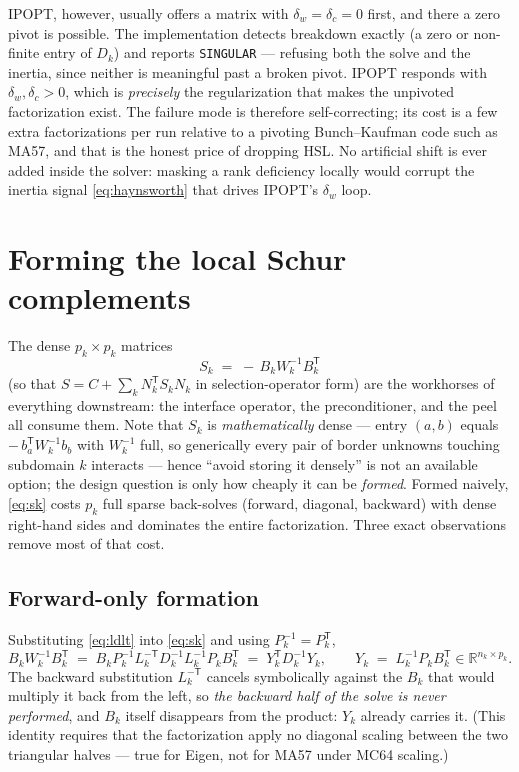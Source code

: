\documentclass[11pt]{article}
\newcommand{\R}{\mathbb{R}}
\newcommand{\code}[1]{\texttt{#1}}
\begin{document}
IPOPT, however, usually offers a matrix with $\delta_w = \delta_c = 0$ first,
and there a zero pivot is possible.  The implementation detects breakdown
exactly (a zero or non-finite entry of $D_k$) and reports
\code{SINGULAR} --- refusing both the solve and the inertia, since neither is
meaningful past a broken pivot.  IPOPT responds with $\delta_w,\delta_c > 0$,
which is \emph{precisely} the regularization that makes the unpivoted
factorization exist.  The failure mode is therefore self-correcting; its cost
is a few extra factorizations per run relative to a pivoting Bunch--Kaufman
code such as MA57, and that is the honest price of dropping HSL.  No
artificial shift is ever added inside the solver: masking a rank deficiency
locally would corrupt the inertia signal \eqref{eq:haynsworth} that drives
IPOPT's $\delta_w$ loop.

\section{Forming the local Schur complements}
\label{sec:sk}

The dense $p_k \times p_k$ matrices
\begin{equation}
  S_k \;=\; -\,B_k W_k^{-1} B_k^{\mathsf T}
  \label{eq:sk}
\end{equation}
(so that $S = C + \sum_k N_k^{\mathsf T} S_k N_k$ in selection-operator form)
are the workhorses of everything downstream: the interface operator, the
preconditioner, and the peel all consume them.  Note that $S_k$ is
\emph{mathematically} dense --- entry $(a,b)$ equals
$-\,b_a^{\mathsf T} W_k^{-1} b_b$ with $W_k^{-1}$ full, so generically every
pair of border unknowns touching subdomain $k$ interacts --- hence ``avoid
storing it densely'' is not an available option; the design question is only
how cheaply it can be \emph{formed}.  Formed naively, \eqref{eq:sk} costs
$p_k$ full sparse back-solves (forward, diagonal, backward) with dense
right-hand sides and dominates the entire factorization.  Three exact
observations remove most of that cost.

\subsection{Forward-only formation}

Substituting \eqref{eq:ldlt} into \eqref{eq:sk} and using
$P_k^{-1} = P_k^{\mathsf T}$,
\begin{equation}
  B_k W_k^{-1} B_k^{\mathsf T}
  \;=\; B_k P_k^{-1} L_k^{-\mathsf T} D_k^{-1} L_k^{-1} P_k B_k^{\mathsf T}
  \;=\; Y_k^{\mathsf T} D_k^{-1} Y_k,
  \qquad
  Y_k \;=\; L_k^{-1} P_k B_k^{\mathsf T} \in \R^{n_k\times p_k}.
  \label{eq:forward-only}
\end{equation}
The backward substitution $L_k^{-\mathsf T}$ cancels symbolically against the
$B_k$ that would multiply it back from the left, so \emph{the backward half
of the solve is never performed}, and $B_k$ itself disappears from the
product: $Y_k$ already carries it.  (This identity requires that the
factorization apply no diagonal scaling between the two triangular halves ---
true for Eigen, not for MA57 under MC64 scaling.)
\end{document}
